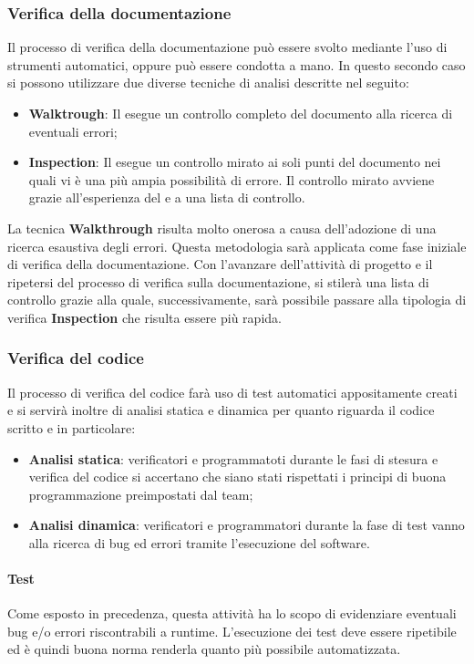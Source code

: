 \subsubsection{Verifica della documentazione}
Il processo di verifica della documentazione può essere svolto mediante l'uso di strumenti automatici, oppure può essere condotta a mano. In questo secondo caso si possono utilizzare due diverse tecniche di analisi descritte nel seguito:
\begin{itemize}
    \item \textbf{Walktrough}: Il \roleVerifierLow{} esegue un controllo completo del documento alla ricerca di eventuali errori;
    \item \textbf{Inspection}: Il \roleVerifierLow{} esegue un controllo mirato ai soli punti del documento nei quali vi è una più ampia possibilità di errore. Il controllo mirato avviene grazie all'esperienza del \roleVerifierLow{} e a una lista di controllo\glo{}.
\end{itemize}
La tecnica \textbf{Walkthrough} risulta molto onerosa a causa dell'adozione di una ricerca esaustiva degli errori. Questa metodologia sarà applicata come fase iniziale di verifica della documentazione. Con l'avanzare dell'attività di progetto e il ripetersi del processo di verifica sulla documentazione, si stilerà una lista di controllo\glo{} grazie alla quale, successivamente, sarà possibile passare alla tipologia di verifica \textbf{Inspection} che risulta essere più rapida.

\subsubsection{Verifica del codice}
Il processo di verifica del codice farà uso di test automatici appositamente creati e si servirà inoltre di analisi statica e dinamica per quanto riguarda il codice scritto e in particolare:
\begin{itemize}
    \item \textbf{Analisi statica}: verificatori e programmatoti durante le fasi di stesura e verifica del codice si accertano che siano stati rispettati i principi di buona programmazione preimpostati dal team;
    \item \textbf{Analisi dinamica}: verificatori e programmatori durante la fase di test vanno alla ricerca di bug\glo{} ed errori tramite l'esecuzione del software.
\end{itemize}

\paragraph{Test}
Come esposto in precedenza, questa attività ha lo scopo di evidenziare eventuali bug\glo{} e/o errori riscontrabili a runtime. L'esecuzione dei test deve essere ripetibile ed è quindi buona norma renderla quanto più possibile automatizzata.

